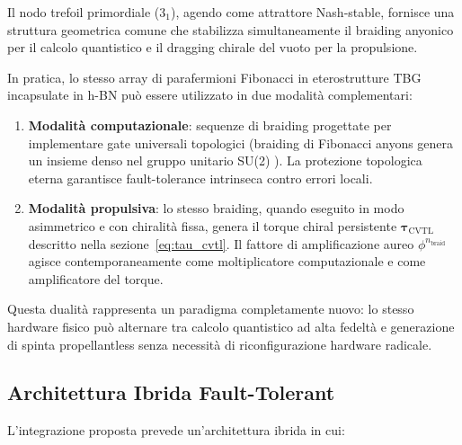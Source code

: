 \documentclass[11pt,a4paper]{article}
\let\oldcite\cite
\renewcommand{\cite}{\protect\oldcite}
\let\oldref\ref
\renewcommand{\ref}{\protect\oldref}
\theoremstyle{plain}
\theoremstyle{definition}
\begin{document}
\vspace{0.2cm}

Il nodo trefoil primordiale ($3_1$), agendo come attrattore Nash-stable, fornisce una struttura geometrica comune che stabilizza simultaneamente il braiding anyonico per il calcolo quantistico e il dragging chirale del vuoto per la propulsione. 


\vspace{0.2cm}


In pratica, lo stesso array di parafermioni Fibonacci in eterostrutture TBG incapsulate in h-BN può essere utilizzato in due modalità complementari:

\begin{enumerate}
    \item \textbf{Modalità computazionale}: sequenze di braiding progettate per implementare gate universali topologici (braiding di Fibonacci anyons genera un insieme denso nel gruppo unitario SU(2) \cite{Nayak2008}). La protezione topologica eterna garantisce fault-tolerance intrinseca contro errori locali.
    
    \item \textbf{Modalità propulsiva}: lo stesso braiding, quando eseguito in modo asimmetrico e con chiralità fissa, genera il torque chiral persistente $\boldsymbol{\tau}_{\text{CVTL}}$ descritto nella sezione~\ref{eq:tau_cvtl}. Il fattore di amplificazione aureo $\phi^{n_{\text{braid}}}$ agisce contemporaneamente come moltiplicatore computazionale e come amplificatore del torque.
\end{enumerate}

Questa dualità rappresenta un paradigma completamente nuovo: lo stesso hardware fisico può alternare tra calcolo quantistico ad alta fedeltà e generazione di spinta propellantless senza necessità di riconfigurazione hardware radicale.



\vspace{0.4cm}


\subsection{Architettura Ibrida Fault-Tolerant}

\vspace{0.1cm}

L’integrazione proposta prevede un’architettura ibrida in cui:

\vspace{0.1cm}
\end{document}
